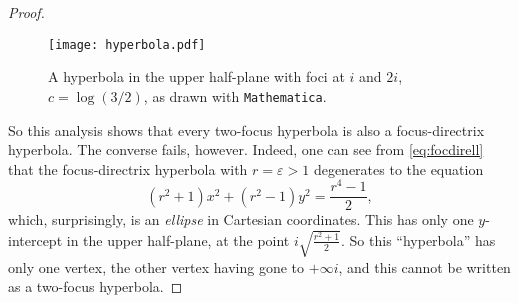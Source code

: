 \documentclass[12pt]{amsart}
\theoremstyle{definition}
\begin{document}
\begin{proof}
\begin{figure}[hbt]
\begin{center}
\texttt{[image: hyperbola.pdf]}
\end{center}
\caption{A hyperbola in the upper half-plane with foci at $i$ and $2i$,
  $c=\log(3/2)$, as drawn with \texttt{Mathematica}.}
\label{fig:hyp}
\end{figure}

So this analysis shows that every two-focus hyperbola is also a
focus-directrix hyperbola.  The converse fails, however. Indeed,
one can see from \eqref{eq:focdirell} that the focus-directrix hyperbola
with $r=\varepsilon>1$ degenerates to the equation
\[
(r^2 + 1) x^2 + (r^2 - 1) y^2  = \frac{r^4 - 1}{2},
\]
which, surprisingly, is an \emph{ellipse} in Cartesian coordinates.
This has only one $y$-intercept in the upper half-plane, at
the point $i\sqrt{\frac{r^2 + 1}{2}}$.  So this ``hyperbola'' has only
one vertex, the other vertex having gone to $+\infty i$, and this
cannot be written as a two-focus hyperbola.
\end{proof}



\end{document}
